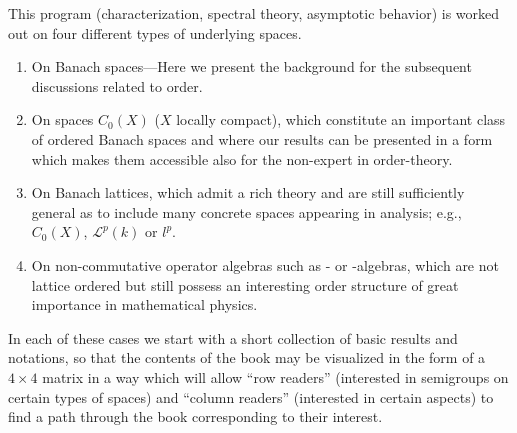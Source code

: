 This program (characterization, spectral theory, asymptotic behavior) is worked out on four different types of underlying spaces.
\newpage
\begin{enumerate}[label=(\Alph*)]
\item 
On Banach spaces---Here we present the background for the subsequent discussions related to order.

\item 
On spaces $C_{0}(X)$ ($X$ locally compact), which constitute an important class of ordered Banach spaces and where our results can be presented in a form which makes them accessible also for the non-expert in order-theory.

\item 
On Banach lattices, which admit a rich theory and are still sufficiently general as to include many concrete spaces appearing in analysis; e.g., $C_0(X)$, $\mathcal{L}^p(k)$ or $l^p$.

\item 
On non-commutative operator algebras such as \CA- or \WA-algebras, which are not lattice ordered but still possess an interesting order structure of great importance in mathematical physics.

\end{enumerate}
In each of these cases we start with a short collection of basic results and notations, so that the contents of the book may be visualized in the form of a $4 \times 4$ matrix in a way which will allow \enquote{row readers} (interested in semigroups on certain types of spaces) and \enquote{column readers} (interested in certain aspects) to find a path through the book corresponding to their interest.

